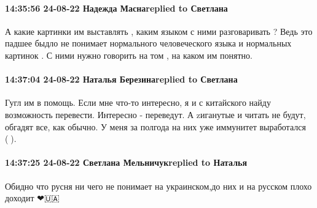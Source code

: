  
 
 
 
 

\paragraph{14:35:56 24-08-22 Надежда Маснаreplied to Светлана}

А какие картинки им выставлять , каким языком с ними разговаривать ? Ведь это
падшее быдло не понимает нормального человеческого языка и нормальных картинок
. С ними нужно говорить на том , на каком им понятно.

\paragraph{14:37:04 24-08-22 Наталья Березинаreplied to Светлана}

Гугл им в помощь. Если мне что-то интересно, я и с китайского найду возможность
перевести. Интересно - переведут. А zиганутые и читать не будут, обгадят все,
как обычно. У меня за полгода на них уже иммунитет выработался (🤣).

\paragraph{14:37:25 24-08-22 Светлана Мельничукreplied to Наталья}

Обидно что русня ни чего не понимает на украинском,до них и на русском плохо
доходит ❤🇺🇦
